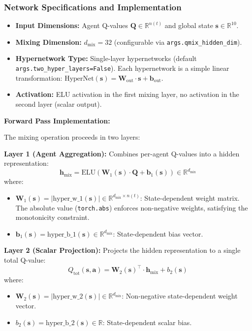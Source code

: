 \subsubsection{Network Specifications and Implementation}
\begin{itemize}
\item \textbf{Input Dimensions:} Agent Q-values \(\mathbf{Q} \in \mathbb{R}^{n(t)}\) and global state \(\mathbf{s} \in \mathbb{R}^{10}\).
\item \textbf{Mixing Dimension:} \(d_{\text{mix}} = 32\) (configurable via \texttt{args.qmix\_hidden\_dim}).
\item \textbf{Hypernetwork Type:} Single-layer hypernetworks (default \texttt{args.two\_hyper\_layers=False}). Each hypernetwork is a simple linear transformation: \(\text{HyperNet}(\mathbf{s}) = \mathbf{W}_{\text{out}} \cdot \mathbf{s} + \mathbf{b}_{\text{out}}\).
\item \textbf{Activation:} ELU activation in the first mixing layer, no activation in the second layer (scalar output).
\end{itemize}

\textbf{Forward Pass Implementation:}

The mixing operation proceeds in two layers:

\textbf{Layer 1 (Agent Aggregation):} Combines per-agent Q-values into a hidden representation:
\[
\mathbf{h}_{\text{mix}} = \text{ELU}\left( \mathbf{W}_1(\mathbf{s}) \cdot \mathbf{Q} + \mathbf{b}_1(\mathbf{s}) \right) \in \mathbb{R}^{d_{\text{mix}}}
\]
where:
\begin{itemize}
    \item \(\mathbf{W}_1(\mathbf{s}) = |\text{hyper\_w\_1}(\mathbf{s})| \in \mathbb{R}^{d_{\text{mix}} \times n(t)}\): State-dependent weight matrix. The absolute value (\texttt{torch.abs}) enforces non-negative weights, satisfying the monotonicity constraint.
    \item \(\mathbf{b}_1(\mathbf{s}) = \text{hyper\_b\_1}(\mathbf{s}) \in \mathbb{R}^{d_{\text{mix}}}\): State-dependent bias vector.
\end{itemize}

\textbf{Layer 2 (Scalar Projection):} Projects the hidden representation to a single total Q-value:
\[
Q_{\text{tot}}(\mathbf{s}, \mathbf{a}) = \mathbf{W}_2(\mathbf{s})^\top \cdot \mathbf{h}_{\text{mix}} + b_2(\mathbf{s})
\]
where:
\begin{itemize}
    \item \(\mathbf{W}_2(\mathbf{s}) = |\text{hyper\_w\_2}(\mathbf{s})| \in \mathbb{R}^{d_{\text{mix}}}\): Non-negative state-dependent weight vector.
    \item \(b_2(\mathbf{s}) = \text{hyper\_b\_2}(\mathbf{s}) \in \mathbb{R}\): State-dependent scalar bias.
\end{itemize}

